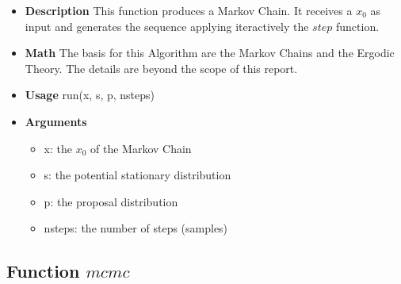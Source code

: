 \documentclass{article}
\begin{document}
\begin{itemize}
    \item \textbf{Description}\newline
    This function produces a Markov Chain. It receives a $x_0$ as input and generates the sequence applying iteractively the $step$ function.
    \item \textbf{Math}\newline
    The basis for this Algorithm are the Markov Chains and the Ergodic Theory. The details are beyond the scope of this report.
    
    \item \textbf{Usage}\newline
    run(x, s, p, nsteps)
    
    \item \textbf{Arguments}
    \begin{itemize}
        \item x: the $x_0$ of the Markov Chain 
        \item s: the potential stationary distribution 
        \item p: the proposal distribution
        \item nsteps: the number of steps (samples)
    \end{itemize}
    
\end{itemize}

\subsection{Function $mcmc$}
\end{document}
